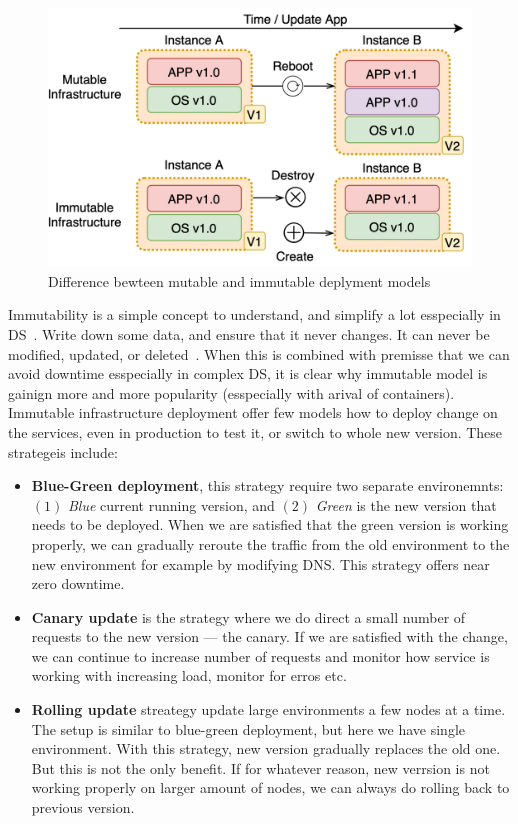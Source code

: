 \begin{figure}[H]
	\begin{center}
		\includegraphics[scale=0.9]{images/Figure12.png}
	\end{center}
	\vspace{-0.6cm}
	\caption{Difference bewteen mutable and immutable deplyment models}
	\label{fig:fig12}
\end{figure}

Immutability is a simple concept to understand, and simplify a lot esspecially in DS~\cite{Helland16}. Write down some data, and ensure that it never changes. It can never be modified, updated, or deleted~\cite{perry2020art}. When this is combined with premisse that we can avoid downtime esspecially in complex DS, it is clear why immutable model is gainign more and more popularity (esspecially with arival of containers). Immutable infrastructure deployment offer few models how to deploy change on the services, even in production to test it, or switch to whole new version. These strategeis include:

\begin{itemize}
	\item \textbf{Blue-Green deployment}, this strategy require two separate environemnts: $(1)$ \textit{Blue} current running version, and $(2)$ \textit{Green} is the new version that needs to be deployed. When we are satisfied that the green version is working properly, we can gradually reroute the traffic from the old environment to the new environment for example by modifying DNS. This strategy offers near zero downtime.
	\item \textbf{Canary update} is the strategy where we do direct a small number of requests to the new version --- the canary. If we are satisfied with the change, we can continue to increase number of requests and monitor how service is working with increasing load, monitor for erros etc.
	\item \textbf{Rolling update} streategy update large environments a few nodes at a time. The setup is similar to blue-green deployment, but here we have single environment. With this strategy, new version gradually replaces the old one. But this is not the only benefit. If for whatever reason, new verrsion is not working properly on larger amount of nodes, we can always do rolling back to previous version.
\end{itemize}

